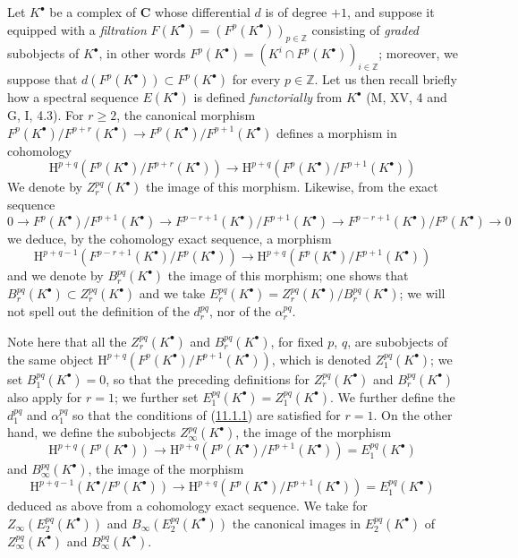 \begin{env}[11.2.2]
\label{0.11.2.2}
Let $K^\bullet$ be a complex of $\boldsymbol{C}$ whose differential
$d$ is of degree $+1$, and suppose it equipped with a \emph{filtration}
$F(K^\bullet)=(F^p(K^\bullet))_{p\in\mathbb Z}$ consisting of \emph{graded} subobjects
of $K^\bullet$, in other words
$F^p(K^\bullet)=(K^i\cap F^p(K^\bullet))_{i\in\mathbb Z}$; moreover, we
suppose that $d(F^p(K^\bullet))\subset F^p(K^\bullet)$ for every
$p\in\mathbb Z$. Let us then recall briefly how a spectral sequence
$E(K^\bullet)$ is defined \emph{functorially} from
$K^\bullet$ (M, XV, 4 and G, I, 4.3). For $r\geq2$, the canonical morphism
$F^p(K^\bullet)/F^{p+r}(K^\bullet)\to
F^p(K^\bullet)/F^{p+1}(K^\bullet)$ defines a morphism in cohomology
\[
  \mathrm H^{p+q}(F^p(K^\bullet)/F^{p+r}(K^\bullet))
  \longrightarrow
  \mathrm H^{p+q}(F^p(K^\bullet)/F^{p+1}(K^\bullet))
\]
We denote by $Z_r^{pq}(K^\bullet)$ the image of this morphism. Likewise, from the
exact sequence
\[
  0\to F^p(K^\bullet)/F^{p+1}(K^\bullet)
  \to F^{p-r+1}(K^\bullet)/F^{p+1}(K^\bullet)
  \to F^{p-r+1}(K^\bullet)/F^p(K^\bullet)\to0
\]
we deduce, by the cohomology exact sequence, a morphism
\[
  \mathrm H^{p+q-1}(F^{p-r+1}(K^\bullet)/F^p(K^\bullet))
  \longrightarrow
  \mathrm H^{p+q}(F^p(K^\bullet)/F^{p+1}(K^\bullet))
\]
and we denote by $B_r^{pq}(K^\bullet)$ the image of this morphism; one shows
that $B_r^{pq}(K^\bullet)\subset Z_r^{pq}(K^\bullet)$ and we take
$E_r^{pq}(K^\bullet)=Z_r^{pq}(K^\bullet)/B_r^{pq}(K^\bullet)$; we will not
spell out the definition of the $d_r^{pq}$, nor of the $\alpha_r^{pq}$.

Note here that all the $Z_r^{pq}(K^\bullet)$ and
$B_r^{pq}(K^\bullet)$, for fixed $p$, $q$, are subobjects of the same
object
$\mathrm H^{p+q}(F^p(K^\bullet)/F^{p+1}(K^\bullet))$, which is denoted
$Z_1^{pq}(K^\bullet)$; we set $B_1^{pq}(K^\bullet)=0$, so that the
preceding definitions for $Z_r^{pq}(K^\bullet)$ and
$B_r^{pq}(K^\bullet)$ also apply for $r=1$; we further set
$E_1^{pq}(K^\bullet)=Z_1^{pq}(K^\bullet)$. We further define the $d_1^{pq}$
and $\alpha_1^{pq}$ so that the conditions of
(\hyperref[0.11.1.1]{11.1.1}) are satisfied for $r=1$. On the other hand,
we define the subobjects $Z_\infty^{pq}(K^\bullet)$, the image of the morphism
\[
  \mathrm H^{p+q}(F^p(K^\bullet))\longrightarrow
  \mathrm H^{p+q}(F^p(K^\bullet)/F^{p+1}(K^\bullet))
  =E_1^{pq}(K^\bullet)
\]
and $B_\infty^{pq}(K^\bullet)$, the image of the morphism
\[
  \mathrm H^{p+q-1}(K^\bullet/F^p(K^\bullet))\longrightarrow
  \mathrm H^{p+q}(F^p(K^\bullet)/F^{p+1}(K^\bullet))
  =E_1^{pq}(K^\bullet)
\]
deduced as above from a cohomology exact sequence. We take for
$Z_\infty(E_2^{pq}(K^\bullet))$ and $B_\infty(E_2^{pq}(K^\bullet))$ the
canonical images in $E_2^{pq}(K^\bullet)$ of
$Z_\infty^{pq}(K^\bullet)$ and $B_\infty^{pq}(K^\bullet)$.


\end{env}
